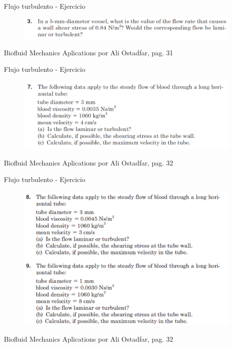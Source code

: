 \begin{frame}{Flujo turbulento - Ejercicio}
\justifying
\begin{figure}[H]
\centering
\includegraphics[scale=0.4]{Section_Files/S2-imagenes-Manuel/10.png}
\end{figure}
{\tiny Biofluid Mechanics Aplications por Ali Ostadfar, pag. 31}
\end{frame}

\begin{frame}{Flujo turbulento - Ejercicio}
\justifying
\begin{figure}[H]
\centering
\includegraphics[scale=0.4]{Section_Files/S2-imagenes-Manuel/11.png}
\end{figure}
{\tiny Biofluid Mechanics Aplications por Ali Ostadfar, pag. 32}
\end{frame}

\begin{frame}{Flujo turbulento - Ejercicio}
\justifying
\begin{figure}[H]
\centering
\includegraphics[scale=0.4]{Section_Files/S2-imagenes-Manuel/12.png}
\end{figure}
{\tiny Biofluid Mechanics Aplications por Ali Ostadfar, pag. 32}
\end{frame}

